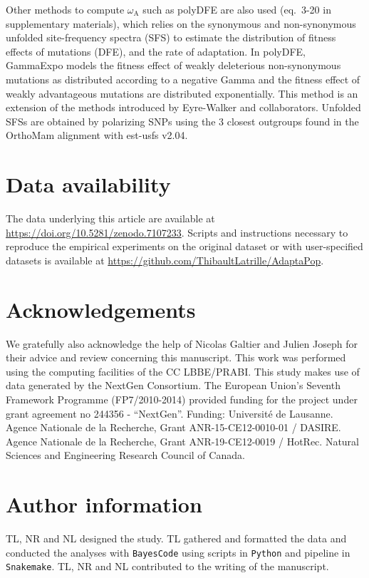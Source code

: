 \documentclass{article}
\newcommand{\rateApop}{\omega_{\mathrm{A}}}
\begin{document}
    Other methods to compute $\rateApop$ such as polyDFE\cite{tataru_polydfe_2020} are also used (eq.~3-20 in supplementary materials), which relies on the synonymous and non-synonymous unfolded site-frequency spectra (SFS) to estimate the distribution of fitness effects of mutations (DFE), and the rate of adaptation.
    In polyDFE, GammaExpo models the fitness effect of weakly deleterious non-synonymous mutations as distributed according to a negative Gamma and the fitness effect of weakly advantageous mutations are distributed exponentially.
    This method is an extension of the methods introduced by Eyre-Walker and collaborators\cite{eyre-walker_distribution_2006, eyre-walker_estimating_2009}.
    Unfolded SFSs are obtained by polarizing SNPs using the $3$ closest outgroups found in the OrthoMam alignment with est-usfs v2.04\cite{keightley_inferring_2018}.

    \section{Data availability}\label{sec:data-availability}
    The data underlying this article are available at \url{https://doi.org/10.5281/zenodo.7107233}.
    Scripts and instructions necessary to reproduce the empirical experiments on the original dataset or with user-specified datasets is available at \url{https://github.com/ThibaultLatrille/AdaptaPop}.

    \section{Acknowledgements}\label{sec:acknowledgements}
    We gratefully also acknowledge the help of Nicolas Galtier and Julien Joseph for their advice and review concerning this manuscript.
    This work was performed using the computing facilities of the CC LBBE/PRABI.
    This study makes use of data generated by the NextGen Consortium.
    The European Union’s Seventh Framework Programme (FP7/2010-2014) provided funding for the project under grant agreement no 244356 - “NextGen”.
    Funding: Université de Lausanne.
    Agence Nationale de la Recherche, Grant ANR-15-CE12-0010-01 / DASIRE.
    Agence Nationale de la Recherche, Grant ANR-19-CE12-0019 / HotRec.
    Natural Sciences and Engineering Research Council of Canada.

    \section{Author information}\label{sec:author-information}
    TL, NR and NL designed the study.
    TL gathered and formatted the data and conducted the analyses with \texttt{BayesCode} using scripts in \texttt{Python} and pipeline in \texttt{Snakemake}.
    TL, NR and NL contributed to the writing of the manuscript.
\end{document}
